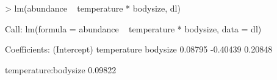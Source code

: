 \documentclass{beamer}
\numberwithin{exercise}{section}
\begin{document}
\begin{frame}[fragile]
\begin{Schunk}
\begin{Sinput}
> lm(abundance ~ temperature * bodysize, dl)
\end{Sinput}
\begin{Soutput}
Call:
lm(formula = abundance ~ temperature * bodysize,
data = dl)

Coefficients:
(Intercept)     temperature     bodysize
    0.08795        -0.40439      0.20848  

temperature:bodysize  
             0.09822
\end{Soutput}
\end{Schunk}
\end{frame}

\end{document}
